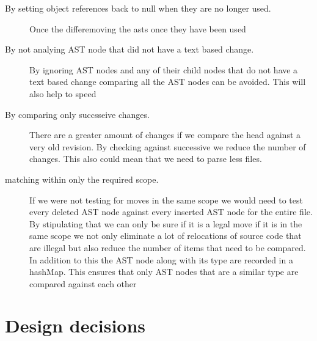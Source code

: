 \begin{description}
  \item [By setting object references back to null when they are no longer used.]

  Once the differemoving the asts once they have been used
  \item [By not analying AST node that did not have a text based change.] 

  By ignoring AST nodes and any of their child nodes that do not have a text based change comparing all the AST nodes can be avoided.  This will also help to speed 
  \item [By comparing only succsseive changes.] 
  There are a greater amount of changes if we compare the head against a very old revision. By checking against successive we reduce the number of changes. This also could mean that we need to parse less files.
  \item [matching within only the required scope.]  
  If we were not testing for moves in the same scope we would need to test every deleted AST node against every inserted AST node for the entire file. By stipulating that we can only be sure if it is a legal move if it is in the same scope we not only eliminate a lot of relocations of source code that are illegal but also reduce the number of items that need to be compared. In addition to this the AST node along with its type are recorded in a hashMap.  This ensures that only AST nodes that are a similar type are compared against each other
  
\end{description}

% 
% 
% 

\section{Design decisions}
% 

% 

